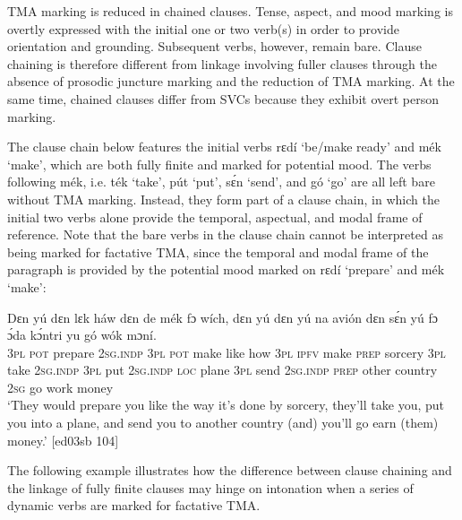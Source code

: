 TMA marking is reduced in chained clauses. Tense, aspect, and mood marking is overtly expressed with the initial one or two verb(s) in order to provide orientation and grounding. Subsequent verbs, however, remain bare. Clause chaining is therefore different from linkage involving fuller clauses through the absence of prosodic juncture marking and the reduction of TMA marking. At the same time, chained clauses differ from SVCs because they exhibit overt person marking.



The clause chain below features the initial verbs rɛdí ‘be/make ready’ and mék ‘make’, which are both fully finite and marked for potential mood. The verbs following mék, i.e. ték ‘take’, pút ‘put’, sɛ́n ‘send’, and gó ‘go’ are all left bare without TMA marking. Instead, they form part of a clause chain, in which the initial two verbs alone provide the temporal, aspectual, and modal frame of reference. Note that the bare verbs in the clause chain cannot be interpreted as being marked for factative TMA,{\fff} since the temporal and modal frame of the paragraph is provided by the potential mood marked on rɛdí ‘prepare’ and mék ‘make’:



\ea%
    \label{ex:key:1611}
    \gll Dɛn        yú    dɛn        lɛk  háw    dɛn  de  mék  
fɔ  wích,  dɛn     yú    dɛn    yú    na  avión
dɛn  sɛ́n    yú    fɔ  ɔ́da    kɔ́ntri   yu  gó  wók    mɔní.\\
\textsc{3pl}  \textsc{pot}  prepare  \textsc{2sg.indp}  \textsc{3pl}  \textsc{pot}  make  like  how    \textsc{3pl}  \textsc{ipfv}  make
\textsc{prep} sorcery  \textsc{3pl}  take    \textsc{2sg.indp}  \textsc{3pl}  put  \textsc{2sg.indp}   \textsc{loc}  plane  
\textsc{3pl}  send  \textsc{2sg.indp}  \textsc{prep}  other  country  \textsc{2sg}  go  work  money\\

\glt ‘They would prepare you like the way it’s done by sorcery, they’ll take you, 
put you into a plane, and send you to another country (and) you’ll go earn 
(them) money.’ [ed03sb 104]
\z

The following example illustrates how the difference between clause chaining and the linkage of fully finite clauses may hinge on intonation when a series of dynamic verbs are marked for factative TMA.



